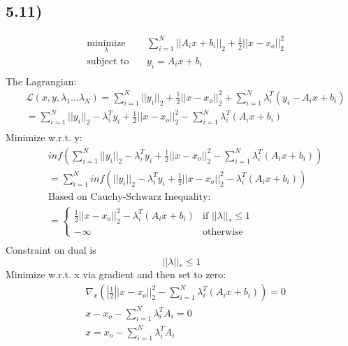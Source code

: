 \documentclass[12pt]{article}
\begin{document}
\subsection*{5.11)}
\begin{equation*}
\begin{aligned}
& \underset{\lambda}{\text{minimize}}
& & \sum_{i=1}^{N}||A_ix+b_i||_2 + \frac{1}{2}||x-x_o||_2^2\\
& \text{subject to}\
& & y_i = A_ix+b_i\\
\end{aligned}
\end{equation*}
The Lagrangian:
\begin{equation*}
\begin{aligned}
& \mathcal{L}(x,y, \lambda_1 \dots \lambda_N) = \sum_{i=1}^{N}||y_i||_2 + \frac{1}{2}||x-x_o||_2^2 + \sum_{i=1}^{N}\lambda_i^T(y_i-A_ix+b_i)\\
& = \sum_{i=1}^{N}||y_i||_2 -\lambda_i^Ty_i + \frac{1}{2}||x-x_o||_2^2 - \sum_{i=1}^{N}\lambda_i^T(A_ix+b_i)\\
\end{aligned}
\end{equation*}
Minimize w.r.t. y:
\begin{equation*}
\begin{aligned}
& inf(\sum_{i=1}^{N}||y_i||_2 -\lambda_i^Ty_i + \frac{1}{2}||x-x_o||_2^2 - \sum_{i=1}^{N}\lambda_i^T(A_ix+b_i))\\
& = \sum_{i=1}^{N}inf(||y_i||_2 -\lambda_i^Ty_i + \frac{1}{2}||x-x_o||_2^2 - \lambda_i^T(A_ix+b_i))\\
& \text{Based on Cauchy-Schwarz Inequality: }\\
& = \begin{cases}
    \frac{1}{2}||x-x_o||_2^2 - \lambda_i^T(A_ix+b_i) & \text{if } ||\lambda||_* \le 1\\
    -\infty & \text{otherwise}
    \end{cases}\\
\end{aligned}
\end{equation*}
Constraint on dual is $$||\lambda||_* \le 1$$
Minimize w.r.t. x via gradient and then set to zero:
\begin{equation*}
\begin{aligned}
& \nabla_x(|\frac{1}{2}||x-x_o||_2^2 - \sum_{i=1}^{N}\lambda_i^T(A_ix+b_i)) = 0\\
& x-x_o - \sum_{i=1}^{N}\lambda_i^TA_i = 0\\
& x = x_o - \sum_{i=1}^{N}\lambda_i^TA_i
\end{aligned}
\end{equation*}
\end{document}
